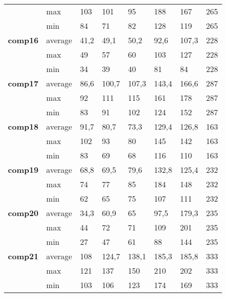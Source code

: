 \begin{table}[!h]
{\begin{tabular}{|l|l|l|l|l|l|l|l|}
        & max & 103 & 101 & 95 & 188 & 167 & 265 \\
        & min & 84 & 71 & 82 & 128 & 119 & 265 \\ \hline
        \textbf{comp16} & average & 41,2 & 49,1 & 50,2 & 92,6 & 107,3 & 228 \\
        & max & 49 & 57 & 60 & 103 & 127 & 228 \\
        & min & 34 & 39 & 40 & 81 & 84 & 228 \\ \hline
        \textbf{comp17} & average & 86,6 & 100,7 & 107,3 & 143,4 & 166,6 & 287 \\
        & max & 92 & 111 & 115 & 161 & 178 & 287 \\
        & min & 83 & 91 & 102 & 124 & 152 & 287 \\ \hline
        \textbf{comp18} & average & 91,7 & 80,7 & 73,3 & 129,4 & 126,8 & 163 \\
        & max & 102 & 93 & 80 & 145 & 142 & 163 \\
        & min & 83 & 69 & 68 & 116 & 110 & 163 \\ \hline
        \textbf{comp19} & average & 68,8 & 69,5 & 79,6 & 132,8 & 125,4 & 232 \\
        & max & 74 & 77 & 85 & 184 & 148 & 232 \\
        & min & 62 & 65 & 75 & 107 & 111 & 232 \\ \hline
        \textbf{comp20} & average & 34,3 & 60,9 & 65 & 97,5 & 179,3 & 235 \\
        & max & 44 & 72 & 71 & 109 & 201 & 235 \\
        & min & 27 & 47 & 61 & 88 & 144 & 235 \\ \hline
        \textbf{comp21} & average & 108 & 124,7 & 138,1 & 185,3 & 185,8 & 333 \\
        & max & 121 & 137 & 150 & 210 & 202 & 333 \\
        & min & 103 & 106 & 123 & 174 & 169 & 333 \\ \hline
    \end{tabular}}
    \label{results-comparison}
\end{table}